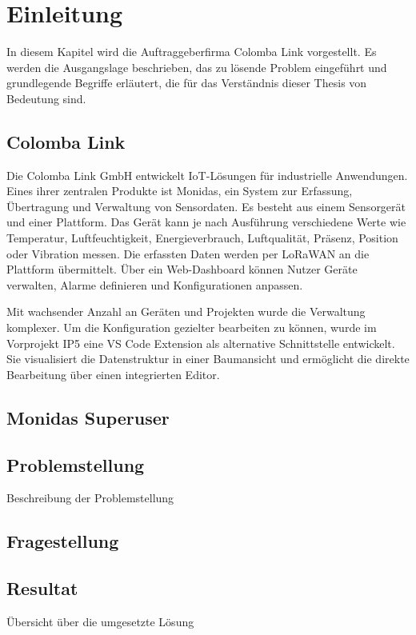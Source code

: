 \section{Einleitung}
In diesem Kapitel wird die Auftraggeberfirma Colomba Link vorgestellt. Es werden die Ausgangslage beschrieben, das zu lösende Problem eingeführt und grundlegende Begriffe erläutert, die für das Verständnis dieser Thesis von Bedeutung sind.

\subsection{Colomba Link}
Die Colomba Link GmbH entwickelt IoT-Lösungen für industrielle Anwendungen. Eines ihrer zentralen Produkte ist Monidas, ein System zur Erfassung, Übertragung und Verwaltung von Sensordaten. Es besteht aus einem Sensorgerät und einer Plattform. Das Gerät kann je nach Ausführung verschiedene Werte wie Temperatur, Luftfeuchtigkeit, Energieverbrauch, Luftqualität, Präsenz, Position oder Vibration messen. Die erfassten Daten werden per LoRaWAN an die Plattform übermittelt. Über ein Web-Dashboard können Nutzer Geräte verwalten, Alarme definieren und Konfigurationen anpassen.

Mit wachsender Anzahl an Geräten und Projekten wurde die Verwaltung komplexer. Um die Konfiguration gezielter bearbeiten zu können, wurde im Vorprojekt IP5 eine VS Code Extension als alternative Schnittstelle entwickelt. Sie visualisiert die Datenstruktur in einer Baumansicht und ermöglicht die direkte Bearbeitung über einen integrierten Editor.

\subsection{Monidas Superuser}


\subsection{Problemstellung}
Beschreibung der Problemstellung

\subsection{Fragestellung}


\subsection{Resultat}
Übersicht über die umgesetzte Lösung

